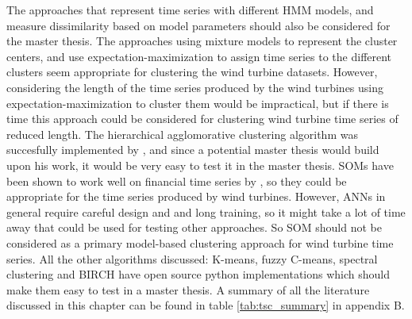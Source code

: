 The approaches that represent time series with different HMM models, and measure dissimilarity based on model parameters \cite{multivariate_tsc_hmm} should also be considered for the master thesis.
The approaches using mixture models to represent the cluster centers, and use expectation-maximization to assign time series to the different clusters seem appropriate for clustering the wind turbine datasets.
However, considering the length of the time series produced by the wind turbines using expectation-maximization to cluster them would be impractical, but if there is time this approach could be considered for clustering wind turbine time series of reduced length. 
The hierarchical agglomorative clustering algorithm was succesfully implemented by \textcite{espen}, and since a potential master thesis would build upon his work, it would be very easy to test it in the master thesis. 
SOMs have been shown to work well on financial time series by \cite{ghsom_optimal_hedge_ratio, stock_price_tsc_regr_trees_som}, 
so they could be appropriate for the time series produced by wind turbines. 
However, ANNs in general require careful design and and long training, so it might take a lot of time away that could be used for testing other approaches. 
So SOM should not be considered as a primary model-based clustering approach for wind turbine time series. 
All the other algorithms discussed: K-means, fuzzy C-means, spectral clustering and BIRCH have open source python implementations which should make them
easy to test in a master thesis. 
A summary of all the literature discussed in this chapter can be found in table \ref{tab:tsc_summary} in appendix B.
